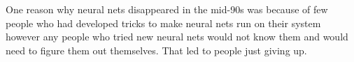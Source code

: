 {\centering{}\par}
\vspace{5pt}

One reason why neural nets disappeared in the mid-90s was because of few people who had developed tricks to make neural nets run on their system however any people who tried new neural nets would not know them and would need to figure them out themselves. That led to people just giving up. 